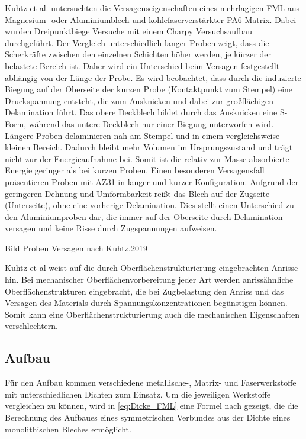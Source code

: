 Kuhtz et al. \cite{Kuhtz.2019} untersuchten die Versagenseigenschaften eines mehrlagigen FML aus Magnesium- oder Aluminiumblech und kohlefaserverstärkter PA6-Matrix. Dabei wurden Dreipunktbiege Versuche mit einem Charpy Versuchsaufbau durchgeführt. Der Vergleich unterschiedlich langer Proben zeigt, dass die Scherkräfte zwischen den einzelnen Schichten höher werden, je kürzer der belastete Bereich ist.  
Daher wird ein Unterschied beim Versagen festgestellt abhängig von der Länge der Probe. Es wird beobachtet, dass durch die induzierte Biegung auf der Oberseite der kurzen Probe (Kontaktpunkt zum Stempel) eine Druckspannung entsteht, die zum Ausknicken und dabei zur großflächigen Delamination führt. 
Das obere Deckblech bildet durch das Ausknicken eine S-Form, während das untere Deckblech nur einer Biegung unterworfen wird.
Längere Proben delaminieren nah am Stempel und in einem vergleichsweise kleinen Bereich. Dadurch bleibt mehr Volumen im Ursprungszustand und trägt nicht zur der Energieaufnahme bei. Somit ist die relativ zur Masse absorbierte Energie geringer als bei kurzen Proben. 
Einen besonderen Versagensfall präsentieren Proben mit AZ31 in langer und kurzer Konfiguration.
Aufgrund der geringeren Dehnung und Umformbarkeit reißt das Blech auf der Zugseite (Unterseite), ohne eine vorherige Delamination. Dies stellt einen Unterschied zu den Aluminiumproben dar, die immer auf der Oberseite durch Delamination versagen und keine Risse durch Zugspannungen aufweisen.

Bild Proben Versagen nach Kuhtz.2019

Kuhtz et al \cite{Kuhtz.2019} weist auf die durch Oberflächenstrukturierung eingebrachten Anrisse hin. Bei mechanischer Oberflächenvorbereitung jeder Art werden anrissähnliche Oberflächenstrukturen eingebracht, die bei Zugbelastung den Anriss und das Versagen des Materials durch Spannungskonzentrationen begünstigen können. Somit kann eine Oberflächenstrukturierung auch die mechanischen Eigenschaften verschlechtern.

\subsection{Aufbau}\label{sec:Aufbau}


Für den Aufbau kommen verschiedene metallische-, Matrix- und Faserwerkstoffe mit unterschiedlichen Dichten zum Einsatz. Um die jeweiligen Werkstoffe vergleichen zu können, wird in \autoref{eq:Dicke_FML} eine Formel nach \cite{Wollmann.2018} gezeigt, die die Berechnung des Aufbaues eines symmetrischen Verbundes aus der Dichte eines monolithischen Bleches ermöglicht.

